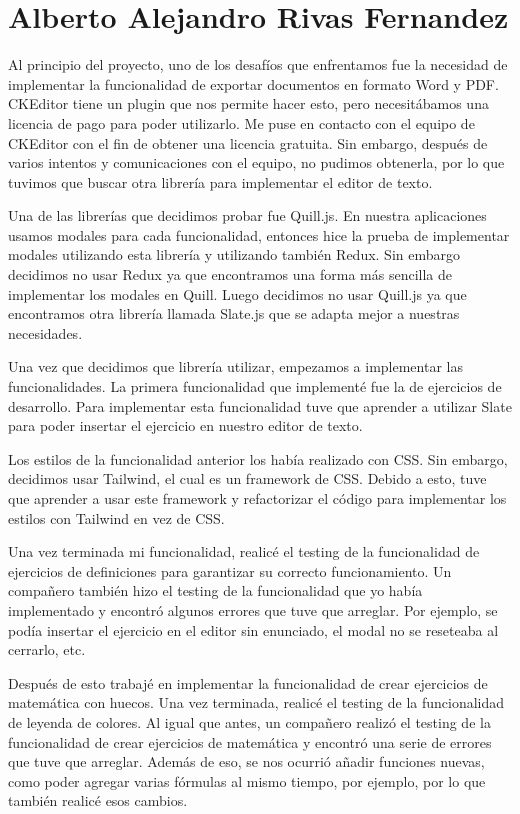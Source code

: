 \section{Alberto Alejandro Rivas Fernandez}
Al principio del proyecto, uno de los desafíos que enfrentamos fue la necesidad de implementar la funcionalidad de exportar documentos en formato Word y PDF. CKEditor tiene un plugin que nos permite hacer esto, pero necesitábamos una licencia de pago para poder utilizarlo. Me puse en contacto con el equipo de CKEditor con el fin de obtener una licencia gratuita. Sin embargo, después de varios intentos y comunicaciones con el equipo, no pudimos obtenerla, por lo que tuvimos que buscar otra librería para implementar el editor de texto. 

Una de las librerías que decidimos probar fue Quill.js. En nuestra aplicaciones usamos modales para cada funcionalidad, entonces hice la prueba de implementar modales utilizando esta librería y utilizando también Redux. Sin embargo decidimos no usar Redux ya que encontramos una forma más sencilla de implementar los modales en Quill. Luego decidimos no usar Quill.js ya que encontramos otra librería llamada Slate.js que se adapta mejor a nuestras necesidades.

Una vez que decidimos que librería utilizar, empezamos a implementar las funcionalidades. La primera funcionalidad que implementé fue la de ejercicios de desarrollo. Para implementar esta funcionalidad tuve que aprender a utilizar Slate para poder insertar el ejercicio en nuestro editor de texto.

Los estilos de la funcionalidad anterior los había realizado con CSS. Sin embargo, decidimos usar Tailwind, el cual es un framework de CSS. Debido a esto, tuve que aprender a usar este framework y refactorizar el código para implementar los estilos con Tailwind en vez de CSS.

Una vez terminada mi funcionalidad, realicé el testing de la funcionalidad de ejercicios de definiciones para garantizar su correcto funcionamiento. Un compañero también hizo el testing de la funcionalidad que yo había implementado y encontró algunos errores que tuve que arreglar. Por ejemplo, se podía insertar el ejercicio en el editor sin enunciado, el modal no se reseteaba al cerrarlo, etc.

Después de esto trabajé en implementar la funcionalidad de crear ejercicios de matemática con huecos. Una vez terminada, realicé el testing de la funcionalidad de leyenda de colores. Al igual que antes, un compañero realizó el testing de la funcionalidad de crear ejercicios de matemática y encontró una serie de errores que tuve que arreglar. Además de eso, se nos ocurrió añadir funciones nuevas, como poder agregar varias fórmulas al mismo tiempo, por ejemplo, por lo que también realicé esos cambios.

